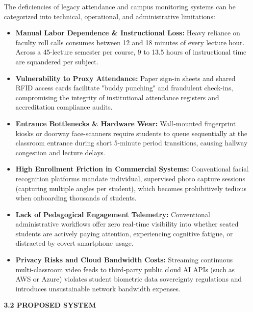 \noindent The deficiencies of legacy attendance and campus monitoring systems can be categorized into technical, operational, and administrative limitations:
\begin{itemize}
    \item \textbf{Manual Labor Dependence \& Instructional Loss:} Heavy reliance on faculty roll calls consumes between 12 and 18 minutes of every lecture hour. Across a 45-lecture semester per course, 9 to 13.5 hours of instructional time are squandered per subject.
    \item \textbf{Vulnerability to Proxy Attendance:} Paper sign-in sheets and shared RFID access cards facilitate "buddy punching" and fraudulent check-ins, compromising the integrity of institutional attendance registers and accreditation compliance audits.
    \item \textbf{Entrance Bottlenecks \& Hardware Wear:} Wall-mounted fingerprint kiosks or doorway face-scanners require students to queue sequentially at the classroom entrance during short 5-minute period transitions, causing hallway congestion and lecture delays.
    \item \textbf{High Enrollment Friction in Commercial Systems:} Conventional facial recognition platforms mandate individual, supervised photo capture sessions (capturing multiple angles per student), which becomes prohibitively tedious when onboarding thousands of students.
    \item \textbf{Lack of Pedagogical Engagement Telemetry:} Conventional administrative workflows offer zero real-time visibility into whether seated students are actively paying attention, experiencing cognitive fatigue, or distracted by covert smartphone usage.
    \item \textbf{Privacy Risks and Cloud Bandwidth Costs:} Streaming continuous multi-classroom video feeds to third-party public cloud AI APIs (such as AWS or Azure) violates student biometric data sovereignty regulations and introduces unsustainable network bandwidth expenses.
\end{itemize}

\vspace{0.2in}
\begin{flushleft}
{\fontsize{14pt}{18pt}\selectfont \textbf{3.2 PROPOSED SYSTEM}}\\[2mm]
\end{flushleft}

